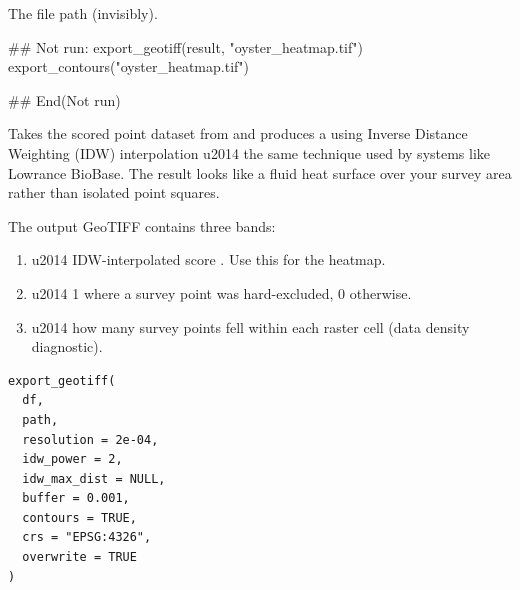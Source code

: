 \documentclass[a4paper]{book}
\begin{document}
%
\begin{Value}
The  file path (invisibly).
\end{Value}
%
\begin{Examples}
\begin{ExampleCode}
## Not run: 
export_geotiff(result, "oyster_heatmap.tif")
export_contours("oyster_heatmap.tif")

## End(Not run)
\end{ExampleCode}
\end{Examples}
%
\begin{Description}
Takes the scored point dataset from  and produces a
 using Inverse Distance Weighting (IDW)
interpolation \bsl{}u2014 the same technique used by systems like Lowrance BioBase.
The result looks like a fluid heat surface over your survey area rather than
isolated point squares.

The output GeoTIFF contains three bands:
\begin{enumerate}

\item{}  \bsl{}u2014 IDW-interpolated score . Use this for the heatmap.
\item{}  \bsl{}u2014 1 where a survey point was hard-excluded, 0 otherwise.
\item{}  \bsl{}u2014 how many survey points fell within each raster cell
(data density diagnostic).

\end{enumerate}

\end{Description}
%
\begin{Usage}
\begin{verbatim}
export_geotiff(
  df,
  path,
  resolution = 2e-04,
  idw_power = 2,
  idw_max_dist = NULL,
  buffer = 0.001,
  contours = TRUE,
  crs = "EPSG:4326",
  overwrite = TRUE
)
\end{verbatim}
\end{Usage}
%
\end{document}
